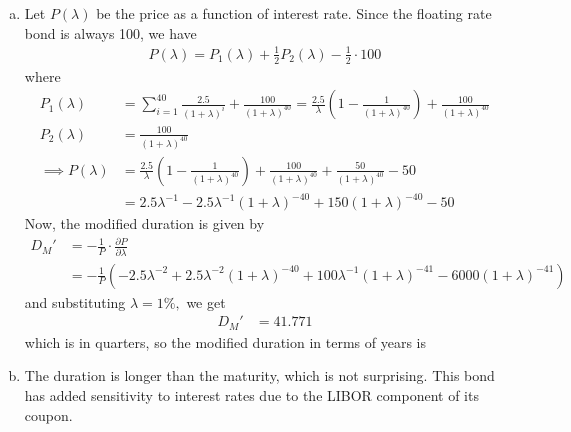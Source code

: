 \documentclass{article}
\begin{document}
\begin{enumerate}[1.]
\begin{enumerate}[(a)]
			\item 
				\begin{soln}
					Let $P(\lambda)$ be the price as a function of interest rate. Since the floating rate bond is always 100, we have
					\begin{align*}
						P(\lambda) = P_1(\lambda) + \frac{1}{2}P_2(\lambda) - \frac{1}{2}\cdot 100 
					\end{align*}
					where
					\begin{align*}
						P_1(\lambda) &= \sum_{i=1}^{40}\frac{2.5}{(1+\lambda)^i} + \frac{100}{(1+\lambda)^{40}} = \frac{2.5}{\lambda}\left( 1-\frac{1}{(1+\lambda)^{40}} \right) + \frac{100}{(1+\lambda)^{40}} \\
						P_2(\lambda) &= \frac{100}{(1+\lambda)^{40}} \\
						\implies P(\lambda) &= \frac{2.5}{\lambda}\left( 1-\frac{1}{(1+\lambda)^{40}} \right) + \frac{100}{(1+\lambda)^{40}} + \frac{50}{(1+\lambda)^{40}} - 50 \\
						&= 2.5\lambda^{-1} - 2.5\lambda^{-1}(1+\lambda)^{-40} + 150(1+\lambda)^{-40} - 50
					\end{align*}
					Now, the modified duration is given by
					\begin{align*}
						D_M' &= -\frac{1}{P} \cdot \frac{\partial P}{\partial\lambda} \\
						&= -\frac{1}{P}\left( -2.5\lambda^{-2}+2.5\lambda^{-2}(1+\lambda)^{-40} + 100\lambda^{-1}(1+\lambda)^{-41} - 6000(1+\lambda)^{-41} \right)
					\end{align*}
					and substituting $\lambda=1\%,$ we get
					\begin{align*}
						D_M' &= 41.771
					\end{align*}
					which is in quarters, so the modified duration in terms of years is 
				\end{soln}

			\item 
				\begin{soln}
					The duration is longer than the maturity, which is not surprising. This bond has added sensitivity to interest rates due to the LIBOR component of its coupon.
				\end{soln}

		\end{enumerate}
		
\end{enumerate}
\end{document}
